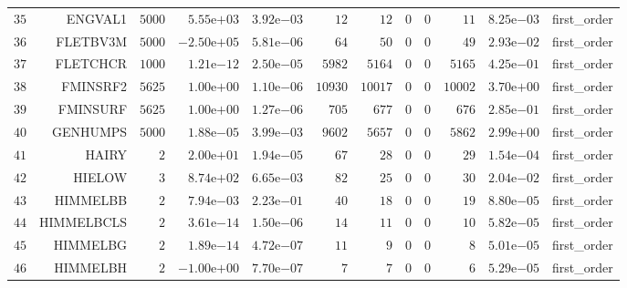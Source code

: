 \begin{longtable}{rrrrrrrrrrrr}
  \(    35\) & ENGVAL1 & \(  5000\) & \( 5.55\)e\(+03\) & \( 3.92\)e\(-03\) & \(    12\) & \(    12\) & \(     0\) & \(     0\) & \(    11\) & \( 8.25\)e\(-03\) & first\_order \\
  \(    36\) & FLETBV3M & \(  5000\) & \(-2.50\)e\(+05\) & \( 5.81\)e\(-06\) & \(    64\) & \(    50\) & \(     0\) & \(     0\) & \(    49\) & \( 2.93\)e\(-02\) & first\_order \\
  \(    37\) & FLETCHCR & \(  1000\) & \( 1.21\)e\(-12\) & \( 2.50\)e\(-05\) & \(  5982\) & \(  5164\) & \(     0\) & \(     0\) & \(  5165\) & \( 4.25\)e\(-01\) & first\_order \\
  \(    38\) & FMINSRF2 & \(  5625\) & \( 1.00\)e\(+00\) & \( 1.10\)e\(-06\) & \( 10930\) & \( 10017\) & \(     0\) & \(     0\) & \( 10002\) & \( 3.70\)e\(+00\) & first\_order \\
  \(    39\) & FMINSURF & \(  5625\) & \( 1.00\)e\(+00\) & \( 1.27\)e\(-06\) & \(   705\) & \(   677\) & \(     0\) & \(     0\) & \(   676\) & \( 2.85\)e\(-01\) & first\_order \\
  \(    40\) & GENHUMPS & \(  5000\) & \( 1.88\)e\(-05\) & \( 3.99\)e\(-03\) & \(  9602\) & \(  5657\) & \(     0\) & \(     0\) & \(  5862\) & \( 2.99\)e\(+00\) & first\_order \\
  \(    41\) & HAIRY & \(     2\) & \( 2.00\)e\(+01\) & \( 1.94\)e\(-05\) & \(    67\) & \(    28\) & \(     0\) & \(     0\) & \(    29\) & \( 1.54\)e\(-04\) & first\_order \\
  \(    42\) & HIELOW & \(     3\) & \( 8.74\)e\(+02\) & \( 6.65\)e\(-03\) & \(    82\) & \(    25\) & \(     0\) & \(     0\) & \(    30\) & \( 2.04\)e\(-02\) & first\_order \\
  \(    43\) & HIMMELBB & \(     2\) & \( 7.94\)e\(-03\) & \( 2.23\)e\(-01\) & \(    40\) & \(    18\) & \(     0\) & \(     0\) & \(    19\) & \( 8.80\)e\(-05\) & first\_order \\
  \(    44\) & HIMMELBCLS & \(     2\) & \( 3.61\)e\(-14\) & \( 1.50\)e\(-06\) & \(    14\) & \(    11\) & \(     0\) & \(     0\) & \(    10\) & \( 5.82\)e\(-05\) & first\_order \\
  \(    45\) & HIMMELBG & \(     2\) & \( 1.89\)e\(-14\) & \( 4.72\)e\(-07\) & \(    11\) & \(     9\) & \(     0\) & \(     0\) & \(     8\) & \( 5.01\)e\(-05\) & first\_order \\
  \(    46\) & HIMMELBH & \(     2\) & \(-1.00\)e\(+00\) & \( 7.70\)e\(-07\) & \(     7\) & \(     7\) & \(     0\) & \(     0\) & \(     6\) & \( 5.29\)e\(-05\) & first\_order \\

\end{longtable}
